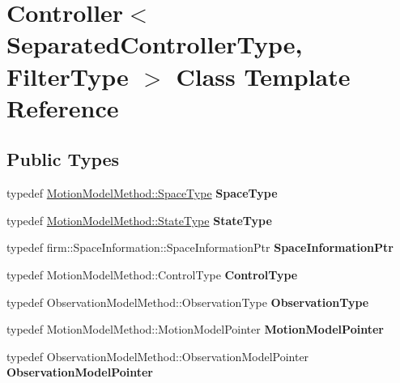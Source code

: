 \hypertarget{class_controller}{\section{\-Controller$<$ \-Separated\-Controller\-Type, \-Filter\-Type $>$ \-Class \-Template \-Reference}
\label{class_controller}
}
\subsection*{\-Public \-Types}
\begin{DoxyCompactItemize}
\item 
\hypertarget{class_controller_aa08894881f64205d60cf7569370af8e1}{typedef \*
\hyperlink{class_s_e2_belief_space}{\-Motion\-Model\-Method\-::\-Space\-Type} {\bfseries \-Space\-Type}}\label{class_controller_aa08894881f64205d60cf7569370af8e1}

\item 
\hypertarget{class_controller_a8fc267f97b0a2a3e1c2b97d791805b5c}{typedef \*
\hyperlink{class_s_e2_belief_space_1_1_state_type}{\-Motion\-Model\-Method\-::\-State\-Type} {\bfseries \-State\-Type}}\label{class_controller_a8fc267f97b0a2a3e1c2b97d791805b5c}

\item 
\hypertarget{class_controller_a0ae807c4f455600c8ca827b816bbd40d}{typedef \*
firm\-::\-Space\-Information\-::\-Space\-Information\-Ptr {\bfseries \-Space\-Information\-Ptr}}\label{class_controller_a0ae807c4f455600c8ca827b816bbd40d}

\item 
\hypertarget{class_controller_ab388284a58474044cc503e876cf0bc7f}{typedef \*
\-Motion\-Model\-Method\-::\-Control\-Type {\bfseries \-Control\-Type}}\label{class_controller_ab388284a58474044cc503e876cf0bc7f}

\item 
\hypertarget{class_controller_a734aecb1a1538fb2154f238796b26d0d}{typedef \*
\-Observation\-Model\-Method\-::\-Observation\-Type {\bfseries \-Observation\-Type}}\label{class_controller_a734aecb1a1538fb2154f238796b26d0d}

\item 
\hypertarget{class_controller_a5b6a5e6d71e96c200e57a52542a4a493}{typedef \*
\-Motion\-Model\-Method\-::\-Motion\-Model\-Pointer {\bfseries \-Motion\-Model\-Pointer}}\label{class_controller_a5b6a5e6d71e96c200e57a52542a4a493}

\item 
\hypertarget{class_controller_a3c4329f9c227302f331c3c2b78cda5d7}{typedef \*
\-Observation\-Model\-Method\-::\-Observation\-Model\-Pointer {\bfseries \-Observation\-Model\-Pointer}}\label{class_controller_a3c4329f9c227302f331c3c2b78cda5d7}

\end{DoxyCompactItemize}
